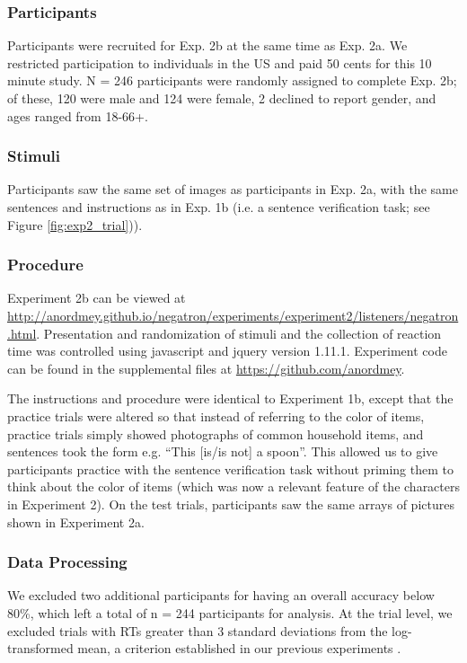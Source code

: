 \documentclass[man, floatsintext, noapacite]{apa6}
\begin{document}
\subsubsection{Participants} 

Participants were recruited for Exp. 2b at the same time as Exp. 2a. We restricted participation to individuals in the US and paid 50 cents for this 10 minute study. N = 246 participants were randomly assigned to complete Exp. 2b; of these, 120 were male and 124 were female, 2 declined to report gender, and ages ranged from 18-66+.

\subsubsection{Stimuli}

Participants saw the same set of images as participants in Exp. 2a, with the same sentences and instructions as in Exp. 1b (i.e. a sentence verification task; see Figure \ref{fig:exp2_trial})).  

\subsubsection{Procedure}

Experiment 2b can be viewed at \url{http://anordmey.github.io/negatron/experiments/experiment2/listeners/negatron.html}. Presentation and randomization of stimuli and the collection of reaction time was controlled using javascript and jquery version 1.11.1. Experiment code can be found in the supplemental files at  \url{https://github.com/anordmey}.

The instructions and procedure were identical to Experiment 1b, except that the practice trials were altered so that instead of referring to the color of items, practice trials simply showed photographs of common household items, and sentences took the form e.g. ``This [is/is not] a spoon''. This allowed us to give participants practice with the sentence verification task without priming them to think about the color of items (which was now a relevant feature of the characters in Experiment 2). On the test trials, participants saw the same arrays of pictures shown in Experiment 2a. 

\subsubsection{Data Processing}

We excluded two additional participants for having an overall accuracy below 80\%, which left a total of n = 244 participants for analysis. At the trial level, we excluded trials with RTs greater than 3 standard deviations from the log-transformed mean, a criterion established in our previous experiments \cite{nordmeyer2014}. 
\end{document}
